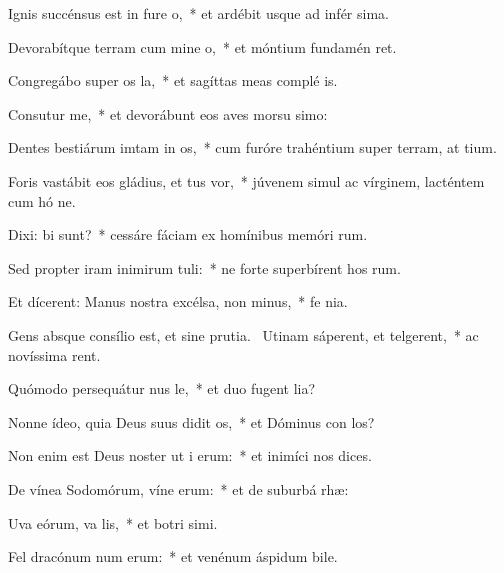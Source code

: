 \item Ignis succénsus est in fure o,~* et ardébit usque ad infér sima.
\item Devorabítque terram cum mine o,~* et móntium fundamén ret.
\item Congregábo super os la,~* et sagíttas meas complé  is.
\item Consutur me,~* et devorábunt eos aves morsu simo:
\item Dentes bestiárum imtam in os,~* cum furóre trahéntium super terram, at tium.
\item Foris vastábit eos gládius, et tus vor,~* júvenem simul ac vírginem, lacténtem cum hó ne.
\item Dixi: bi sunt?~* cessáre fáciam ex homínibus memóri rum.
\item Sed propter iram inimirum tuli:~* ne forte superbírent hos rum.
\item Et dícerent: Manus nostra excélsa,  non minus,~* fe  nia.
\item Gens absque consílio est, et sine prutia.~\pscross{} Utinam sáperent, et telgerent,~* ac novíssima rent.
\item Quómodo persequátur nus le,~* et duo fugent  lia?
\item Nonne ídeo, quia Deus suus didit os,~* et Dóminus con los?
\item Non enim est Deus noster ut i erum:~* et inimíci nos  dices.
\item De vínea Sodomórum, víne erum:~* et de suburbá rhæ:
\item Uva eórum, va lis,~* et botri simi.
\item Fel dracónum num erum:~* et venénum áspidum bile.
